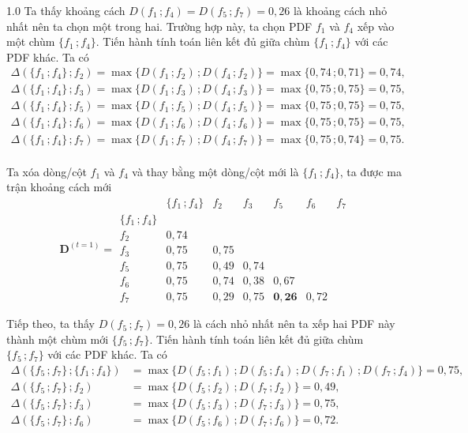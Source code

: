 \documentclass[a4paper,oneside]{book} %
\theoremstyle{plain}
\theoremstyle{plain}
\theoremstyle{nonumberplain}
\begin{document}
\begin{spacing}{1.0}
Ta thấy khoảng cách $D(f_1\,;f_4) = D(f_5\,;f_7)  = 0{,}26$ là khoảng cách nhỏ nhất nên ta chọn một trong hai. Trường hợp này, ta chọn PDF $f_1$ và $f_4$ xếp vào một chùm $\{f_1\,;f_4\}$. Tiến hành tính toán liên kết đủ giữa chùm $\{f_1\,;f_4\}$ với các PDF khác. Ta có
\begin{align*}
	\Delta(\{f_1\,;f_4\}\,; f_2)=\max\{D(f_1\,;f_2)\,; D(f_4\,;f_2)\} = \max\{0{,}74\,;0{,}71\} = 0{,}74,\\
	\Delta(\{f_1\,;f_4\}\,; f_3)=\max\{D(f_1\,;f_3)\,; D(f_4\,;f_3)\} = \max\{0{,}75\,;0{,}75\} = 0{,}75,\\
	\Delta(\{f_1\,;f_4\}\,; f_5)=\max\{D(f_1\,;f_5)\,; D(f_4\,;f_5)\} = \max\{0{,}75\,;0{,}75\} = 0{,}75,\\
	\Delta(\{f_1\,;f_4\}\,; f_6)=\max\{D(f_1\,;f_6)\,; D(f_4\,;f_6)\} = \max\{0{,}75\,;0{,}75\} = 0{,}75,\\
	\Delta(\{f_1\,;f_4\}\,; f_7)=\max\{D(f_1\,;f_7)\,; D(f_4\,;f_7)\} = \max\{0{,}75\,;0{,}74\} = 0{,}75.\\
\end{align*}

Ta xóa dòng/cột $f_1$ và $f_4$ và thay bằng một dòng/cột mới là $\{f_1\,;f_4\}$, ta được ma trận khoảng cách mới
$$
\bm D^{(t=1)} =
\begin{array}{c|cccccc}
	& \{f_1\,;f_4\} & f_2   & f_3   & f_5   & f_6   & f_7 \\
	\hline
	\{f_1\,;f_4\}  &        &        &        &        &        &        \\
	f_2     & 0{,}74 &        &        &        &        &        \\
	f_3     & 0{,}75 & 0{,}75 &        &        &        &        \\
	f_5     & 0{,}75 & 0{,}49 & 0{,}74 &        &        &        \\
	f_6     & 0{,}75 & 0{,}74 & 0{,}38 & 0{,}67 &        &        \\
	f_7     & 0{,}75 & 0{,}29 & 0{,}75 & \mathbf{0{,}26} & 0{,}72 &        
\end{array}
$$


Tiếp theo, ta thấy $D(f_5\,;f_7) = 0{,}26$ là cách nhỏ nhất nên ta xếp hai PDF này thành một chùm mới $\{f_5\,;f_7\}$. Tiến hành tính toán liên kết đủ giữa chùm $\{f_5\,;f_7\}$ với các PDF khác. Ta có
\begin{align*}
	\Delta(\{f_5\,;f_7\}\,; \{f_1\,;f_4\})&=\max\{D(f_5\,;f_1)\,; D(f_5\,;f_4)\,; D(f_7\,;f_1)\,; D(f_7\,;f_4)\} =0,75,\\
	\Delta(\{f_5\,;f_7\}\,; f_2)&=\max\{D(f_5\,;f_2)\,; D(f_7\,;f_2)\} = 0{,}49,\\
	\Delta(\{f_5\,;f_7\}\,; f_3)&=\max\{D(f_5\,;f_3)\,; D(f_7\,;f_3)\} = 0{,}75,\\
	\Delta(\{f_5\,;f_7\}\,; f_6)&=\max\{D(f_5\,;f_6)\,; D(f_7\,;f_6)\} = 0{,}72.\\
\end{align*}


\end{spacing}
\end{document}
